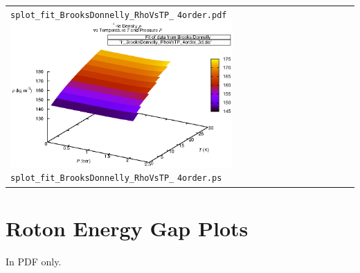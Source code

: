 \documentclass[11pt]{article}
\begin{document}
\begin{center}
\begin{tabular}[\textwidth]{p{8.5cm}p{8.5cm}}
  \verb|splot_fit_BrooksDonnelly_RhoVsTP_|\newline
  \verb|4order.pdf|
\else
  \includegraphics[width=8.5cm]{splot_fit_BrooksDonnelly_RhoVsTP_4order.ps}\newline
  \verb|splot_fit_BrooksDonnelly_RhoVsTP_|\newline
  \verb|4order.ps|
\fi
 \\
\end{tabular}
\end{center}


\newpage
\section{Roton Energy Gap Plots}

In PDF only.
\end{document}
